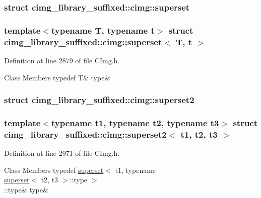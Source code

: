 \subsubsection{struct cimg\+\_\+library\+\_\+suffixed\+:\+:cimg\+:\+:superset}
\subsubsection*{template$<$typename T, typename t$>$\newline
struct cimg\+\_\+library\+\_\+suffixed\+::cimg\+::superset$<$ T, t $>$}



Definition at line 2879 of file C\+Img.\+h.

\begin{DoxyFields}{Class Members}
\mbox{\label{namespacecimg__library__suffixed_1_1cimg_a0de6d4ec641bbc88dafde61fd63c91f8}} 
typedef T&
type&
\\
\hline

\end{DoxyFields}
\label{structcimg__library__suffixed_1_1cimg_1_1superset2}
\subsubsection{struct cimg\+\_\+library\+\_\+suffixed\+:\+:cimg\+:\+:superset2}
\subsubsection*{template$<$typename t1, typename t2, typename t3$>$\newline
struct cimg\+\_\+library\+\_\+suffixed\+::cimg\+::superset2$<$ t1, t2, t3 $>$}



Definition at line 2971 of file C\+Img.\+h.

\begin{DoxyFields}{Class Members}
\mbox{\label{namespacecimg__library__suffixed_1_1cimg_a4f850744d5b934265ec7f77920404b89}} 
typedef \hyperlink{namespacecimg__library__suffixed_1_1cimg_d5/d9e/structcimg__library__suffixed_1_1cimg_1_1superset}{superset}$<$ t1, typename \\
\hyperlink{namespacecimg__library__suffixed_1_1cimg_d5/d9e/structcimg__library__suffixed_1_1cimg_1_1superset}{superset}$<$ t2, t3 $>$::type $>$\\
::type&
type&
\\
\hline

\end{DoxyFields}
\label{structcimg__library__suffixed_1_1cimg_1_1superset3}
